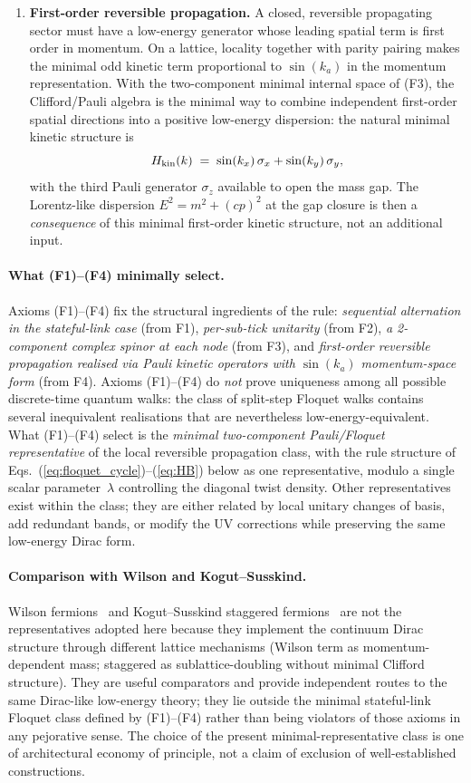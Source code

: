 \documentclass[11pt,a4paper]{article}
\begin{document}
\begin{enumerate}[label=(F\arabic*)]
\item \textbf{First-order reversible propagation.}
A closed, reversible propagating sector must have a low-energy
generator whose leading spatial term is first order in
momentum. On a lattice, locality together with parity pairing
makes the minimal odd kinetic term proportional to $\sin(k_a)$
in the momentum representation. With the two-component minimal
internal space of (F3), the Clifford/Pauli algebra is the
minimal way to combine independent first-order spatial
directions into a positive low-energy dispersion: the natural
minimal kinetic structure is
\[
H_{\rm kin}(k) \;=\; \sin(k_x)\,\sigma_x + \sin(k_y)\,\sigma_y ,
\]
with the third Pauli generator $\sigma_z$ available to open the
mass gap. The Lorentz-like dispersion $E^2 = m^2 + (cp)^2$ at
the gap closure is then a \emph{consequence} of this minimal
first-order kinetic structure, not an additional input.
\end{enumerate}

\paragraph{What (F1)--(F4) minimally select.}
Axioms (F1)--(F4) fix the structural ingredients of the rule:
\emph{sequential alternation in the stateful-link case} (from F1),
\emph{per-sub-tick unitarity} (from F2), \emph{a 2-component
complex spinor at each node} (from F3), and \emph{first-order
reversible propagation realised via Pauli kinetic operators with
$\sin(k_a)$ momentum-space form} (from F4). Axioms (F1)--(F4)
do \emph{not} prove uniqueness among all possible discrete-time
quantum walks: the class of split-step Floquet walks contains
several inequivalent realisations that are nevertheless
low-energy-equivalent. What (F1)--(F4) select is the
\emph{minimal two-component Pauli/Floquet representative} of
the local reversible propagation class, with the rule structure
of Eqs.~(\ref{eq:floquet_cycle})--(\ref{eq:HB}) below as one
representative, modulo a single scalar parameter~$\lambda$
controlling the diagonal twist density. Other representatives
exist within the class; they are either related by local
unitary changes of basis, add redundant bands, or modify the
UV corrections while preserving the same low-energy Dirac form.

\paragraph{Comparison with Wilson and Kogut--Susskind.}
Wilson fermions~\cite{wilson1974} and Kogut--Susskind staggered
fermions~\cite{kogut1975} are not the representatives adopted
here because they implement the continuum Dirac structure
through different lattice mechanisms (Wilson term as
momentum-dependent mass; staggered as sublattice-doubling
without minimal Clifford structure). They are useful comparators
and provide independent routes to the same Dirac-like
low-energy theory; they lie outside the minimal stateful-link
Floquet class defined by (F1)--(F4) rather than being violators
of those axioms in any pejorative sense. The choice of the
present minimal-representative class is one of architectural
economy of principle, not a claim of exclusion of well-established
constructions.
\end{document}
